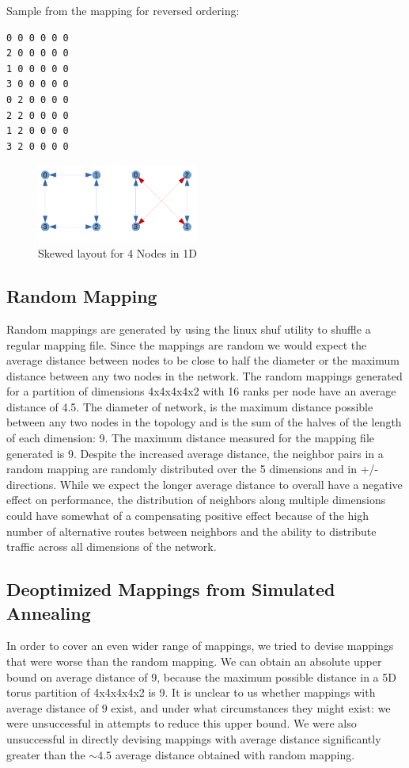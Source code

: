 \documentclass{acm_proc_article-sp}
\begin{document}
Sample from the mapping for reversed ordering:
\begin{lstlisting}[frame=lines, basicstyle=\ttfamily,columns=fixed]
0 0 0 0 0 0
2 0 0 0 0 0
1 0 0 0 0 0
3 0 0 0 0 0
0 2 0 0 0 0
2 2 0 0 0 0
1 2 0 0 0 0
3 2 0 0 0 0
\end{lstlisting}


\begin{figure}
  \center
  \includegraphics[width=0.475\textwidth]{skewed_layout_cropped.pdf}
  \caption{Skewed layout for 4 Nodes in 1D}
    \label{fig:Skewed_layout_for_4_Nodes_in_1D}
\end{figure}

\subsection{Random Mapping}
\label{sect:random}

Random mappings are generated by using the linux shuf utility to shuffle a regular mapping file.
Since the mappings are random we would expect the average distance between nodes to be close to half the diameter
or the maximum distance between any two nodes in the network. The random mappings generated for a partition of
dimensions 4x4x4x4x2 with 16 ranks per node have an average distance of 4.5. The diameter of network, is the maximum
distance possible between any two nodes in the topology and is the sum of the halves of the length of each dimension: 9.
The maximum distance measured for the mapping file generated is 9.
Despite the increased average distance, the neighbor pairs in a random mapping are randomly distributed over the 5 dimensions and in +/- directions.
While we expect the longer average distance to overall have a negative
effect on performance, the distribution of neighbors along multiple
dimensions could have somewhat of a compensating positive effect
because of the high number of alternative routes between neighbors
and the ability to distribute traffic across all dimensions of the network.

\subsection{Deoptimized Mappings from Simulated Annealing}
In order to cover an even wider range of mappings, we tried to
devise mappings that were worse than the random mapping.
We can obtain an absolute upper bound on average distance of
$9$, because the maximum possible distance in a 5D torus
partition of 4x4x4x4x2 is 9.  It is unclear to us whether
mappings with average distance of $9$ exist, and under what
circumstances they might exist: we were unsuccessful in
attempts to reduce this upper bound.  We were also
unsuccessful in directly devising mappings
with average distance significantly greater than the $\sim4.5$ average
distance obtained with random mapping.
\end{document}
